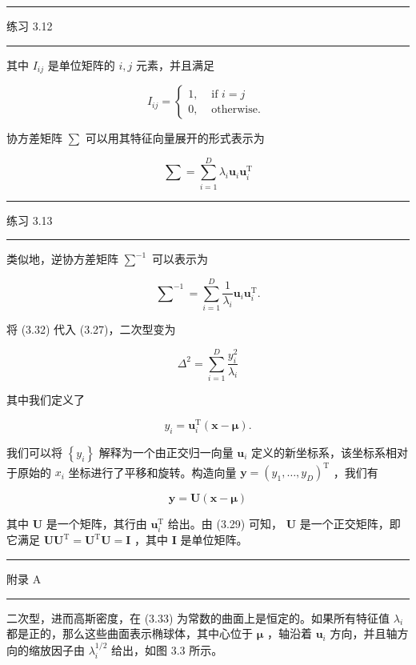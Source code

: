 \documentclass[10pt]{article}
\newcommand{\HRule}{\begin{center}\rule{0.9\linewidth}{0.2mm}\end{center}}
\begin{document}
\HRule

练习 3.12

\HRule

其中 \({I}_{ij}\) 是单位矩阵的 \(i,j\) 元素，并且满足

\[
{I}_{ij} = \left\{  \begin{array}{ll} 1, & \text{ if }i = j \\  0, & \text{ otherwise. } \end{array}\right.  \tag{3.30}
\]

协方差矩阵 \(\mathbf{\sum }\) 可以用其特征向量展开的形式表示为

\[
\mathbf{\sum } = \mathop{\sum }\limits_{{i = 1}}^{D}{\lambda }_{i}{\mathbf{u}}_{i}{\mathbf{u}}_{i}^{\mathrm{T}} \tag{3.31}
\]

\HRule

练习 3.13

\HRule

类似地，逆协方差矩阵 \({\mathbf{\sum }}^{-1}\) 可以表示为

\[
{\mathbf{\sum }}^{-1} = \mathop{\sum }\limits_{{i = 1}}^{D}\frac{1}{{\lambda }_{i}}{\mathbf{u}}_{i}{\mathbf{u}}_{i}^{\mathrm{T}}. \tag{3.32}
\]

将 (3.32) 代入 (3.27)，二次型变为

\[
{\Delta }^{2} = \mathop{\sum }\limits_{{i = 1}}^{D}\frac{{y}_{i}^{2}}{{\lambda }_{i}} \tag{3.33}
\]

其中我们定义了

\[
{y}_{i} = {\mathbf{u}}_{i}^{\mathrm{T}}\left( {\mathbf{x} - \mathbf{\mu }}\right) . \tag{3.34}
\]

我们可以将 \(\left\{  {y}_{i}\right\}\) 解释为一个由正交归一向量 \({\mathbf{u}}_{i}\) 定义的新坐标系，该坐标系相对于原始的 \({x}_{i}\) 坐标进行了平移和旋转。构造向量 \(\mathbf{y} = {\left( {y}_{1},\ldots ,{y}_{D}\right) }^{\mathrm{T}}\) ，我们有

\[
\mathbf{y} = \mathbf{U}\left( {\mathbf{x} - \mathbf{\mu }}\right)  \tag{3.35}
\]

其中 \(\mathbf{U}\) 是一个矩阵，其行由 \({\mathbf{u}}_{i}^{\mathrm{T}}\) 给出。由 (3.29) 可知， \(\mathbf{U}\) 是一个正交矩阵，即它满足 \(\mathbf{U}{\mathbf{U}}^{\mathrm{T}} = {\mathbf{U}}^{\mathrm{T}}\mathbf{U} = \mathbf{I}\) ，其中 \(\mathbf{I}\) 是单位矩阵。

\HRule

附录 A

\HRule

二次型，进而高斯密度，在 (3.33) 为常数的曲面上是恒定的。如果所有特征值 \({\lambda }_{i}\) 都是正的，那么这些曲面表示椭球体，其中心位于 \(\mathbf{\mu }\) ，轴沿着 \({\mathbf{u}}_{i}\) 方向，并且轴方向的缩放因子由 \({\lambda }_{i}^{1/2}\) 给出，如图 3.3 所示。
\end{document}
